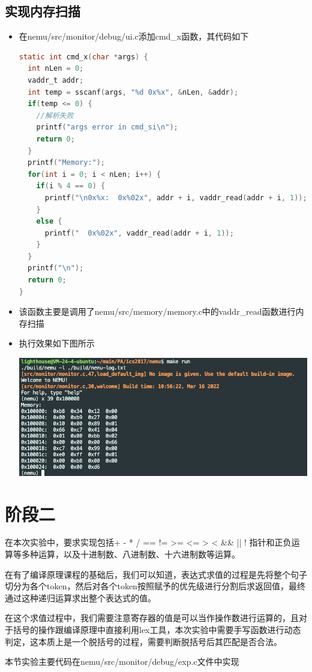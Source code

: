 \documentclass[UTF8,a4paper,10pt]{ctexart}
\begin{document}
\subsection{实现内存扫描}
\begin{itemize}
  \item 在nemu/src/monitor/debug/ui.c添加cmd\_x函数，其代码如下
  \begin{lstlisting}[language = C]
static int cmd_x(char *args) {
  int nLen = 0;
  vaddr_t addr;
  int temp = sscanf(args, "%d 0x%x", &nLen, &addr);
  if(temp <= 0) {
    //解析失败
    printf("args error in cmd_si\n");
    return 0;
  }
  printf("Memory:");
  for(int i = 0; i < nLen; i++) {
    if(i % 4 == 0) {
      printf("\n0x%x:  0x%02x", addr + i, vaddr_read(addr + i, 1));
    }  
    else {
      printf("  0x%02x", vaddr_read(addr + i, 1));
    }
  }
  printf("\n");
  return 0;
}
  \end{lstlisting}
  \item 该函数主要是调用了nemu/src/memory/memory.c中的vaddr\_read函数进行内存扫描
  \item 执行效果如下图所示
  \begin{center}
    \includegraphics[scale = 0.45]{3}
  \end{center}
\end{itemize}

\section{阶段二}
在本次实验中，要求实现包括+ - * / == != >= <= > < \&\& || ! 指针和正负运算等多种运算，以及十进制数、八进制数、十六进制数等运算。 
\par 在有了编译原理课程的基础后，我们可以知道，表达式求值的过程是先将整个句子切分为各个token，然后对各个token按照赋予的优先级进行分割后求返回值，最终通过这种递归运算求出整个表达式的值。
\par 在这个求值过程中，我们需要注意寄存器的值是可以当作操作数进行运算的，且对于括号的操作跟编译原理中直接利用lex工具，本次实验中需要手写函数进行动态判定，这本质上是一个脱括号的过程，需要判断脱括号后其匹配是否合法。
\par 本节实验主要代码在nemu/src/monitor/debug/exp.c文件中实现
\end{document}
